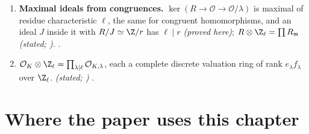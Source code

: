 \begin{enumerate}[label=\textbf{\thechapter.\arabic*}]
$\mathcal O[\alpha]$; the root of $X^2-aX+p$ congruent to a given root modulo a prime above $\lambda$. \emph{(proved here)} .
\item \textbf{Maximal ideals from congruences.} $\ker(R\to\mathcal O\to\mathcal O/\lambda)$ is maximal of residue characteristic $\ell$, the same for congruent
homomorphisms, and an ideal $J$ inside it with $R/J\simeq\Z/r$ has $\ell\mid r$ \emph{(proved here)}; $R\otimes\Z_\ell=\prod R_{\mathfrak m}$ \emph{(stated;
)}. .
\item \textbf{$\mathcal O_K\otimes\Z_\ell=\prod_{\lambda\mid\ell}\mathcal O_{K,\lambda}$}, each a complete discrete valuation ring of rank $e_\lambda f_\lambda$ over $\Z_\ell$.
\emph{(stated; )} .
\end{enumerate}

\section*{Where the paper uses this chapter}

